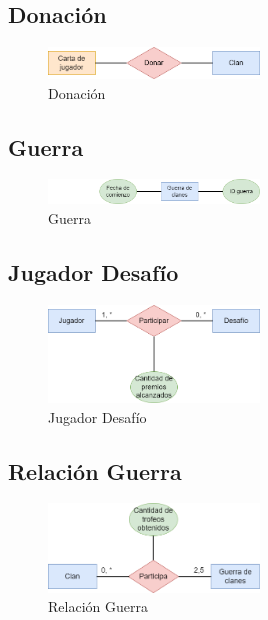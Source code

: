 \subsection{Donación}
\begin{figure}[H]
\centering
\includegraphics[width=0.5\textwidth]{../images/merx_gift.png}
\caption{Donación}
\end{figure}

\subsection{Guerra}
\begin{figure}[H]
\centering
\includegraphics[width=0.5\textwidth]{../images/merx_war.png}
\caption{Guerra}
\end{figure}

\subsection{Jugador Desafío}
\begin{figure}[H]
\centering
\includegraphics[width=0.5\textwidth]{../images/merx_playerchallenge.png}
\caption{Jugador Desafío}
\end{figure}

\subsection{Relación Guerra}
\begin{figure}[H]
\centering
\includegraphics[width=0.5\textwidth]{../images/merx_clanwar.png}
\caption{Relación Guerra}
\end{figure}
